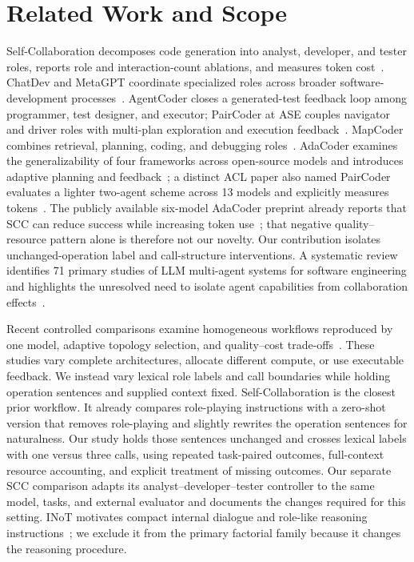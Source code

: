 \section{Related Work and Scope}
Self-Collaboration decomposes code generation into analyst, developer, and tester roles, reports role and interaction-count ablations, and measures token cost~\cite{dong2023selfcollaboration}. ChatDev and MetaGPT coordinate specialized roles across broader software-development processes~\cite{qian2024chatdev,hong2024metagpt}. AgentCoder closes a generated-test feedback loop among programmer, test designer, and executor; PairCoder at ASE couples navigator and driver roles with multi-plan exploration and execution feedback~\cite{huang2023agentcoder,zhang2024paircoder}. MapCoder combines retrieval, planning, coding, and debugging roles~\cite{islam2024mapcoder}. AdaCoder examines the generalizability of four frameworks across open-source models and introduces adaptive planning and feedback~\cite{zhu2025adacoderpreprint,zhu2026adacoder}; a distinct ACL paper also named PairCoder evaluates a lighter two-agent scheme across 13 models and explicitly measures tokens~\cite{chen2026paircoder}. The publicly available six-model AdaCoder preprint already reports that SCC can reduce success while increasing token use~\cite{zhu2025adacoderpreprint}; that negative quality--resource pattern alone is therefore not our novelty. Our contribution isolates unchanged-operation label and call-structure interventions. A systematic review identifies 71 primary studies of LLM multi-agent systems for software engineering and highlights the unresolved need to isolate agent capabilities from collaboration effects~\cite{he2025lma}.

Recent controlled comparisons examine homogeneous workflows reproduced by one model, adaptive topology selection, and quality--cost trade-offs~\cite{xu2026oneflow,hong2026dats,kapoor2025agents}. These studies vary complete architectures, allocate different compute, or use executable feedback. We instead vary lexical role labels and call boundaries while holding operation sentences and supplied context fixed. Self-Collaboration is the closest prior workflow. It already compares role-playing instructions with a zero-shot version that removes role-playing and slightly rewrites the operation sentences for naturalness. Our study holds those sentences unchanged and crosses lexical labels with one versus three calls, using repeated task-paired outcomes, full-context resource accounting, and explicit treatment of missing outcomes. Our separate SCC comparison adapts its analyst--developer--tester controller to the same model, tasks, and external evaluator and documents the changes required for this setting. INoT motivates compact internal dialogue and role-like reasoning instructions~\cite{sun2025inot}; we exclude it from the primary factorial family because it changes the reasoning procedure.

